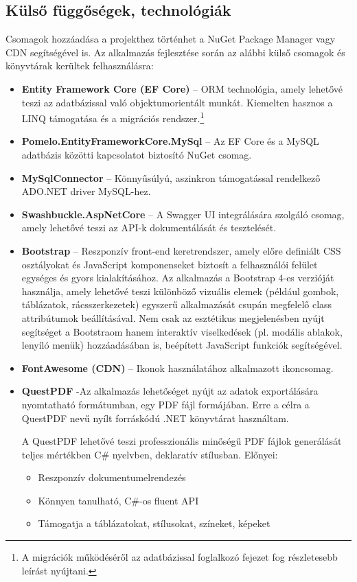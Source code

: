 \subsection{Külső függőségek, technológiák}

Csomagok hozzáadása a projekthez történhet a NuGet Package Manager vagy CDN segítségével is. Az alkalmazás fejlesztése során az alábbi külső csomagok és könyvtárak kerültek felhasználásra:

\begin{itemize}
	\item \textbf{Entity Framework Core (EF Core)} – ORM technológia, amely lehetővé teszi az adatbázissal való objektumorientált munkát. Kiemelten hasznos a LINQ támogatása és a migrációs rendszer.\footnote{A migrációk működéséről az adatbázissal foglalkozó fejezet fog részletesebb leírást nyújtani.}
	\item \textbf{Pomelo.EntityFrameworkCore.MySql} – Az EF Core és a MySQL adatbázis közötti kapcsolatot biztosító NuGet csomag.
	\item \textbf{MySqlConnector} – Könnyűsúlyú, aszinkron támogatással rendelkező ADO.NET driver MySQL-hez.
	\item \textbf{Swashbuckle.AspNetCore} – A Swagger UI integrálására szolgáló csomag, amely lehetővé teszi az API-k dokumentálását és tesztelését.
	\item \textbf{Bootstrap} – Reszponzív front-end keretrendszer, amely előre definiált CSS osztályokat és JavaScript komponenseket biztosít a felhasználói felület egységes és gyors kialakításához. Az alkalmazás a Bootstrap 4-es verzióját használja, amely lehetővé teszi különböző vizuális elemek (például gombok, táblázatok, rácsszerkezetek) egyszerű alkalmazását csupán megfelelő class attribútumok beállításával. Nem csak az esztétikus megjelenésben nyújt segítséget a Bootstraom hanem interaktív viselkedések (pl. modális ablakok, lenyíló menük) hozzáadásában is, beépített JavaScript funkciók segítségével.
	\item \textbf{FontAwesome (CDN)} – Ikonok használatához alkalmazott ikoncsomag.
	\item \textbf{QuestPDF} -Az alkalmazás lehetőséget nyújt az adatok exportálására nyomtatható formátumban, egy PDF fájl formájában. Erre a célra a QuestPDF nevű nyílt forráskódú .NET könyvtárat használtam.
	
	A QuestPDF lehetővé teszi professzionális minőségű PDF fájlok generálását teljes mértékben C\# nyelvben, deklaratív stílusban. Előnyei:
	\begin{itemize}
		\item Reszponzív dokumentumelrendezés
		\item Könnyen tanulható, C\#-os fluent API
		\item Támogatja a táblázatokat, stílusokat, színeket, képeket
	\end{itemize}


\end{itemize}
